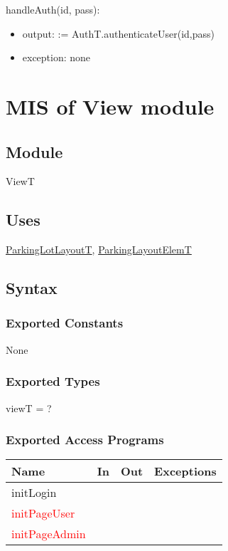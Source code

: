 \documentclass[12pt, titlepage]{article}
\begin{document}
\noindent handleAuth(id, pass):
\begin{itemize}
    \item output:  := AuthT.authenticateUser(id,pass)
    \item exception: none
\end{itemize}

\newpage

\section{MIS of View module}
\label{view:Module}

\subsection{Module}
ViewT

\subsection{Uses}
\hyperref[parkingLotLayout:Module]{ParkingLotLayoutT}, 
\hyperref[parkingLayoutElem:Module]{ParkingLayoutElemT} 

\subsection{Syntax}

\subsubsection{Exported Constants}
None

\subsubsection{Exported Types}
viewT = ?

\subsubsection{Exported Access Programs}

\begin{tabular}{l l l l}
\hline
\textbf{Name} & \textbf{In} & \textbf{Out} & \textbf{Exceptions} \\
\hline
initLogin & ~ & ~ & ~ \\
\hline
\textcolor{red}{initPageUser} & ~ & ~ & ~ \\
\hline
\textcolor{red}{initPageAdmin} & ~ & ~ & ~ \\
\hline
\end{tabular}
\end{document}
